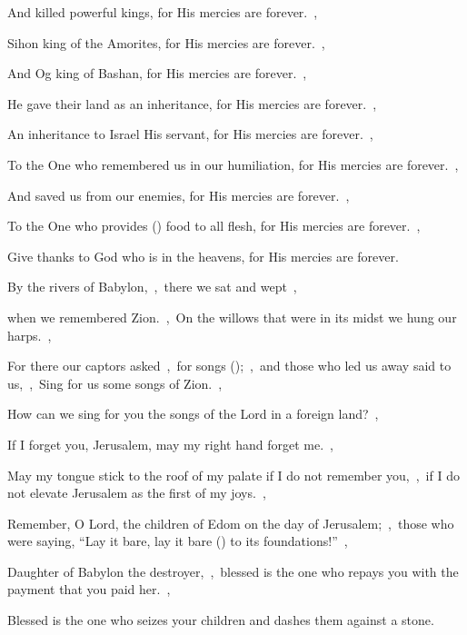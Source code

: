 \documentclass[12pt,twoside,a5paper]{article}
\begin{document}
\begin{normalparskip}
  And killed powerful kings, for His mercies are forever.~\sep

  Sihon king of the Amorites, for His mercies are forever.~\sep

  And Og king of Bashan, for His mercies are forever.~\sep

  He gave their land as an inheritance, for His mercies are forever.~\sep

  An inheritance to Israel His servant, for His mercies are forever.~\sep

  To the One who remembered us in our humiliation, for His mercies are forever.~\sep

  And saved us from our enemies, for His mercies are forever.~\sep

  To the One who provides () food to all flesh, for His mercies are forever.~\sep

  Give thanks to God who is in the heavens, for His mercies are forever.
\end{normalparskip}


\begin{normalparskip}
  By the rivers of Babylon,~\sep\ there we sat and wept~\sep


  when we remembered Zion.~\sep\ On the willows that were in its midst we hung our harps.~\sep

  For there our captors asked~\sep\ for songs ();~\sep\ and those who led us away said to us,~\sep\ Sing for us some songs of Zion.~\sep

  How can we sing for you the songs of the Lord in a foreign land?~\sep

  If I forget you, Jerusalem, may my right hand forget me.~\sep

  May my tongue stick to the roof of my palate if I do not remember you,~\sep\ if I do not elevate Jerusalem as the first of my joys.~\sep

  Remember, O Lord, the children of Edom on the day of Jerusalem;~\sep\ those who were saying, ``Lay it bare, lay it bare () to its foundations!''~\sep

  Daughter of Babylon the destroyer,~\sep\ blessed is the one who repays you with the payment that you paid her.~\sep

  Blessed is the one who seizes your children and dashes them against a stone.
\end{normalparskip}
\end{document}
